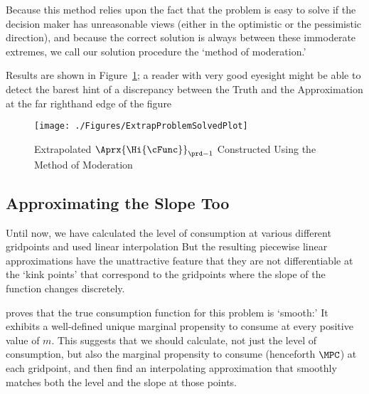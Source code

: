   Because this method relies upon the fact that the problem is easy to
  solve if the decision maker has unreasonable views (either in the
  optimistic or the pessimistic direction), and because the correct
  solution is always between these immoderate extremes, we call our
  solution procedure the `method of moderation.'

  Results are shown in Figure~\ref{fig:ExtrapProblemSolved}; a reader
  with very good eyesight might be able to detect the barest hint of a
  discrepancy between the Truth and the Approximation at the far
  righthand edge of the figure
  \hypertarget{ExtrapProblemSolvedPlot}{}
  \begin{figure}
    \texttt{[image: ./Figures/ExtrapProblemSolvedPlot]}
    \caption{Extrapolated $\Aprx{\Hi{\cFunc}}_{\prd-1}$ Constructed Using the Method of Moderation}
    \label{fig:ExtrapProblemSolved}
  \end{figure}

\hypertarget{approximating-the-slope-too}{}
\subsection{Approximating the Slope Too}


Until now, we have calculated the level of consumption at various different gridpoints and used linear interpolation  But the resulting piecewise linear approximations have the unattractive feature that they are not differentiable at the `kink points' that correspond to the gridpoints where the slope of the function changes discretely.



\cite{BufferStockTheory} proves that the true consumption function for
this problem
is `smooth:' It
exhibits a well-defined unique marginal propensity to consume at every
positive value of $m$.  This suggests that we should calculate, not
just the level of consumption, but also the marginal propensity to
consume (henceforth $\MPC$) at each gridpoint, and then find an
interpolating approximation that smoothly matches both the level and the slope
at those points.

